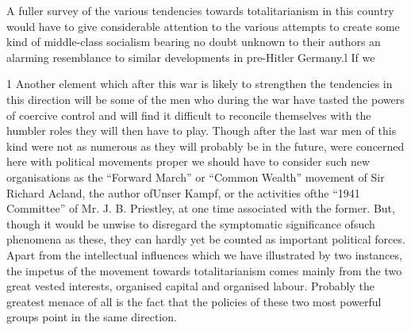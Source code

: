 \documentclass[11pt,openany]{book}
\begin{document}
\begin{center}\textasteriskcentered\hspace{0.9em}\textasteriskcentered\hspace{0.9em}\textasteriskcentered\end{center}

\begin{center}\textasteriskcentered\hspace{0.9em}\textasteriskcentered\hspace{0.9em}\textasteriskcentered\end{center}

\begin{center}\textasteriskcentered\hspace{0.9em}\textasteriskcentered\hspace{0.9em}\textasteriskcentered\end{center}

\begin{center}\textasteriskcentered\hspace{0.9em}\textasteriskcentered\hspace{0.9em}\textasteriskcentered\end{center}

\begin{center}\textasteriskcentered\hspace{0.9em}\textasteriskcentered\hspace{0.9em}\textasteriskcentered\end{center}

A fuller survey of the various tendencies towards totalitarianism in this country would have to give considerable attention to the various attempts to create some kind of middle-class socialism bearing no doubt unknown to their authors an alarming resemblance to similar developments in pre-Hitler Germany.l If we

1 Another element which after this war is likely to strengthen the tendencies in this direction will be some of the men who during the war have tasted the powers of coercive control and will find it difficult to reconcile themselves with the humbler roles they will then have to play. Though after the last war men of this kind were not as numerous as they will probably be in the future, were concerned here with political movements proper we should have to consider such new organisations as the ``Forward March'' or ``Common Wealth'' movement of Sir Richard Acland, the author ofUnser Kampf, or the activities ofthe ``1941 Committee'' of Mr. J. B. Priestley, at one time associated with the former. But, though it would be unwise to disregard the symptomatic significance ofsuch phenomena as these, they can hardly yet be counted as important political forces. Apart from the intellectual influences which we have illustrated by two instances, the impetus of the movement towards totalitarianism comes mainly from the two great vested interests, organised capital and organised labour. Probably the greatest menace of all is the fact that the policies of these two most powerful groups point in the same direction.
\end{document}
